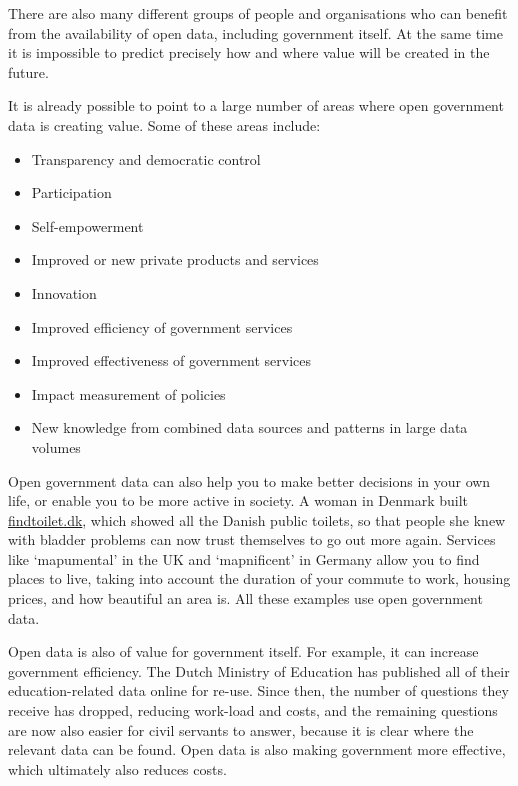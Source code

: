 \documentclass[letterpaper,12pt,oneside]{sphinxmanual}
\begin{document}
There are also many different groups of people and organisations who can benefit from the availability of open data, including government itself. At the same time it is impossible to predict precisely how and where value will be created in the future.

It is already possible to point to a large number of areas where open government data is creating value. Some of these areas include:
\begin{itemize}
\item {} 
Transparency and democratic control

\item {} 
Participation

\item {} 
Self-empowerment

\item {} 
Improved or new private products and services

\item {} 
Innovation

\item {} 
Improved efficiency of government services

\item {} 
Improved effectiveness of government services

\item {} 
Impact measurement of policies

\item {} 
New knowledge from combined data sources and patterns in large data volumes

\end{itemize}

Open government data can also help you to make better decisions in your own life, or enable you to be more active in society. A woman in Denmark built \href{http://findtoilet.dk}{findtoilet.dk}, which showed all the Danish public toilets, so that people she knew with bladder problems can now trust themselves to go out more again.
Services like ‘mapumental’ in the UK and ‘mapnificent’ in Germany allow you to find places to live, taking into account the duration of your commute to work, housing prices, and how beautiful an area is. All these examples use open government data.

Open data is also of value for government itself. For example, it can increase government efficiency. The Dutch Ministry of Education has published all of their education-related data online for re-use. Since then, the number of questions they receive has dropped, reducing work-load and costs, and the remaining questions are now also easier for civil servants to answer, because it is clear where the relevant data can be found. Open data is also making government more effective, which ultimately also reduces costs.
\end{document}
